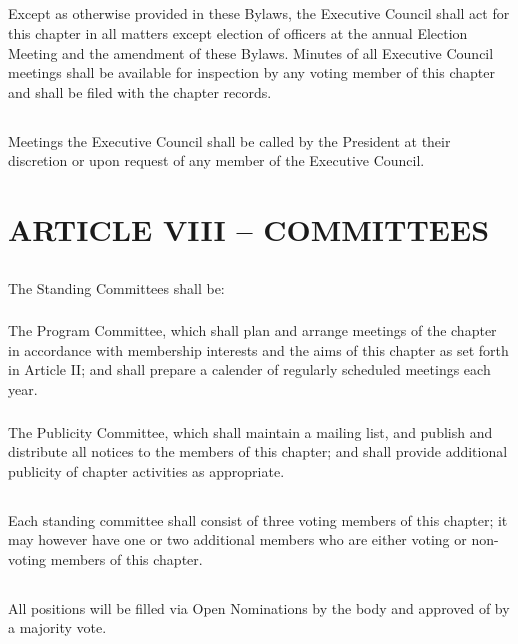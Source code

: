\documentclass[12pt]{article}
\begin{document}
\subsection{}	Except as otherwise provided in these Bylaws, the Executive Council shall act for this chapter in all matters except election of officers at the annual Election Meeting and the amendment of these Bylaws. Minutes of all Executive Council meetings shall be available for inspection by any voting member of this chapter and shall be filed with the chapter records.
\subsection{}	Meetings the Executive Council shall be called by the President at their discretion or upon request of any member of the Executive Council.

\section{ARTICLE VIII – COMMITTEES}
\subsection{}	The Standing Committees shall be:
\subsubsection{}	The Program Committee, which shall plan and arrange meetings of the chapter in accordance with membership interests and the aims of this chapter as set forth in Article II; and shall prepare a calender of regularly scheduled meetings each year.
\subsubsection{}	The Publicity Committee, which shall maintain a mailing list, and publish and distribute all notices to the members of this chapter; and shall provide additional publicity of chapter activities as appropriate.
\subsection{}	Each standing committee shall consist of three voting members of this chapter; it may however have one or two additional members who are either voting or non-voting members of this chapter.
\subsection{}	All positions will be filled via Open Nominations by the body and approved of by a majority vote.
\end{document}
